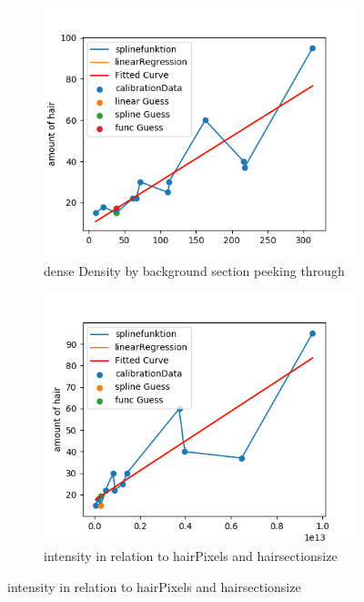 \documentclass[german,a4paper, 12pt]{scrartcl}
\begin{document}
\begin{figure}[H] %
	\begin{subfigure}{0.48\textwidth}
		\includegraphics[width=1.15\linewidth]{fig64/g07_denseDensitybyBackgroundSections.png}
		\caption{dense Density by background section peeking through} \label{fig:a}
	\end{subfigure}\hspace*{\fill}
	\begin{subfigure}{0.48\textwidth}
		\includegraphics[width=1.15\linewidth]{fig64/g08_intensitynorm.png}
		\caption{intensity in relation to hairPixels and hairsectionsize} \label{fig:b}
	\end{subfigure}
	

\end{figure}
\end{document}
